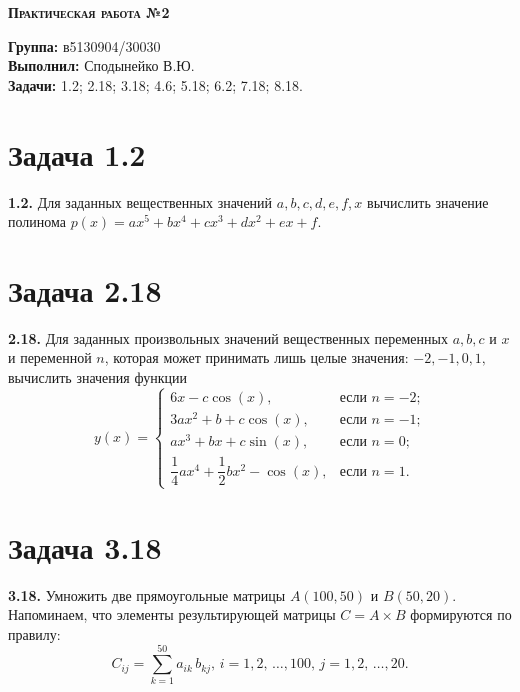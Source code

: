 \documentclass[a4paper,12pt]{article}
\begin{document}
\begin{center}
  \begin{large} {\bfseries{\scshape Практическая работа №2}} \end{large}
\end{center}

\noindent \textbf{Группа:} в5130904/30030\\
\textbf{Выполнил:} Сподынейко В.Ю.\\
\textbf{Задачи:} 1.2; 2.18; 3.18; 4.6; 5.18; 6.2; 7.18;
8.18. \par\medskip

\section* {\large Задача 1.2}
\textbf{1.2.} Для заданных вещественных значений $a, b, c, d, e, f, x$
вычислить значение полинома
   \begin{math}
     {p(x)=ax^5+bx^4+cx^3+dx^2+ex+f}. 
   \end{math}

\section* {\large Задача 2.18}
\textbf{2.18.} Для заданных произвольных значений вещественных
переменных $a, b, c$ и $x$ и переменной $n$, которая может принимать
лишь целые значения: $-2, -1, 0, 1,$ вычислить значения функции
   \begin{displaymath}
   y(x)= \begin{cases}
             6x - c\cos(x), &\text{если $n=-2$;} \\
             3ax^2+b+c\cos(x), &\text{если $n=-1$;} \\
             ax^3+bx+c\sin(x), &\text{если $n=0$;} \\
             \dfrac{1}{4}ax^4+\dfrac{1}{2}bx^2-\cos(x), &\text{если $n=1$.}
   \end{cases}
   \end{displaymath}


\section* {\large Задача 3.18}
\textbf{3.18.} Умножить две прямоугольные матрицы $A(100, 50)$ и
$B(50, 20).$  \\
Напоминаем, что элементы результирующей матрицы $C=A \times B$
формируются по правилу:
   \begin{displaymath}
   C_{ij}=\sum_{k=1}^{50}a_{ik}\, b_{kj},\, i=1,2,\, \ldots,100,\, j=1,2,\, \ldots,20.
   \end{displaymath}
\end{document}
